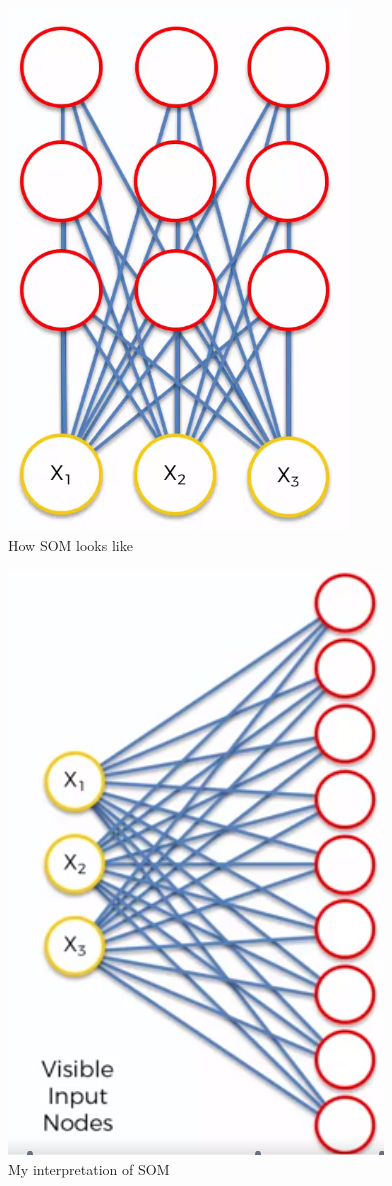\documentclass[]{report}
\begin{document}
\begin{figure}[H]
\centering
\includegraphics[scale=0.4]{som-representation1}
\caption{How SOM looks like}
\end{figure}

\begin{figure}[H]
\centering
\includegraphics[scale=0.4]{som-representation2}
\caption{My interpretation of SOM}
\end{figure}
\end{document}
